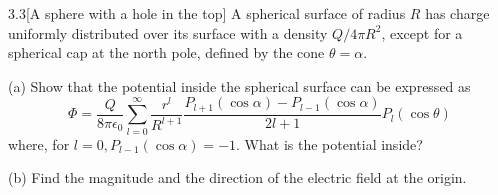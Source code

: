 \documentclass[12pt]{article}
\begin{document}
\begin{problem}{3.3}[A sphere with a hole in the top]
A spherical surface of radius $R$ has charge uniformly distributed over its
surface with a density $Q /4\pi R^2$, except for a spherical cap at the north
pole, defined by the cone $\theta=\alpha$.

(a) Show that the potential inside the spherical surface can be expressed as
\begin{equation}
    \Phi=\frac{Q}{8\pi\epsilon_0}\sum_{l=0}^\infty\frac{r^l}{R^{l+1}}\frac{P_{l+1}(\cos\alpha)-P_{l-1}(\cos\alpha)}{2l+1}P_l(\cos\theta) 
\end{equation}
where, for $l=0,P_{l-1}(\cos\alpha)=-1$. What is the potential inside?

(b) Find the magnitude and the direction of the electric field at the origin.


\end{problem}
\end{document}
